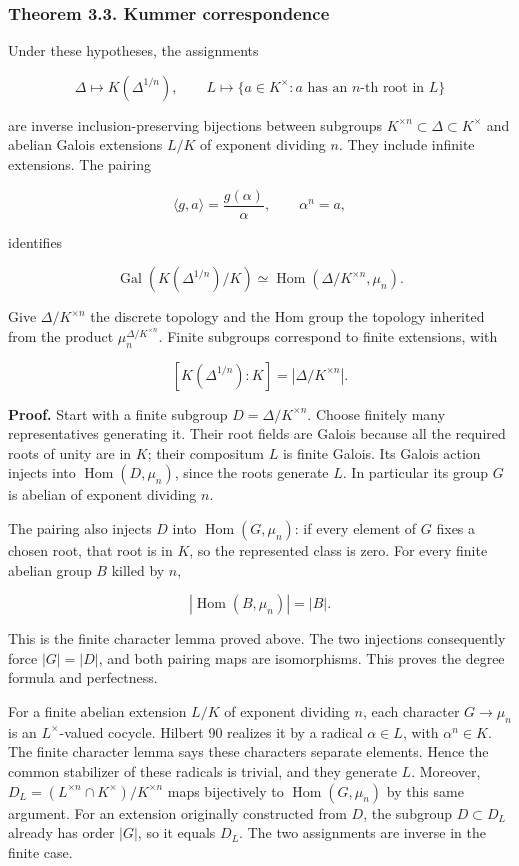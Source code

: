 \documentclass[11pt,a4paper]{article}
\begin{document}
\subsubsection{Theorem 3.3. Kummer
correspondence}\label{theorem-3.3.-kummer-correspondence}

Under these hypotheses, the assignments

\[
\Delta\longmapsto K(\Delta^{1/n}),
\qquad
L\longmapsto\{a\in K^\times:a\text{ has an }n\text{-th root in }L\}
\]

are inverse inclusion-preserving bijections between subgroups
\(K^{\times n}\subset\Delta\subset K^\times\) and abelian Galois
extensions \(L/K\) of exponent dividing \(n\). They include infinite
extensions. The pairing

\[
\langle g,a\rangle=\frac{g(\alpha)}\alpha,
\qquad \alpha^n=a,
\]

identifies

\[
\operatorname{Gal}(K(\Delta^{1/n})/K)
\simeq\operatorname{Hom}(\Delta/K^{\times n},\mu_n).
\]

Give \(\Delta/K^{\times n}\) the discrete topology and the Hom group the
topology inherited from the product \(\mu_n^{\Delta/K^{\times n}}\).
Finite subgroups correspond to finite extensions, with

\[
[K(\Delta^{1/n}):K]=|\Delta/K^{\times n}|.
\]

\textbf{Proof.} Start with a finite subgroup \(D=\Delta/K^{\times n}\).
Choose finitely many representatives generating it. Their root fields
are Galois because all the required roots of unity are in \(K\); their
compositum \(L\) is finite Galois. Its Galois action injects into
\(\operatorname{Hom}(D,\mu_n)\), since the roots generate \(L\). In
particular its group \(G\) is abelian of exponent dividing \(n\).

The pairing also injects \(D\) into \(\operatorname{Hom}(G,\mu_n)\): if
every element of \(G\) fixes a chosen root, that root is in \(K\), so
the represented class is zero. For every finite abelian group \(B\)
killed by \(n\),

\[
|\operatorname{Hom}(B,\mu_n)|=|B|.
\]

This is the finite character lemma proved above. The two injections
consequently force \(|G|=|D|\), and both pairing maps are isomorphisms.
This proves the degree formula and perfectness.

For a finite abelian extension \(L/K\) of exponent dividing \(n\), each
character \(G\to\mu_n\) is an \(L^\times\)-valued cocycle. Hilbert 90
realizes it by a radical \(\alpha\in L\), with \(\alpha^n\in K\). The
finite character lemma says these characters separate elements. Hence
the common stabilizer of these radicals is trivial, and they generate
\(L\). Moreover, \(D_L=(L^{\times n}\cap K^\times)/K^{\times n}\) maps
bijectively to \(\operatorname{Hom}(G,\mu_n)\) by this same argument.
For an extension originally constructed from \(D\), the subgroup
\(D\subset D_L\) already has order \(|G|\), so it equals \(D_L\). The
two assignments are inverse in the finite case.
\end{document}
